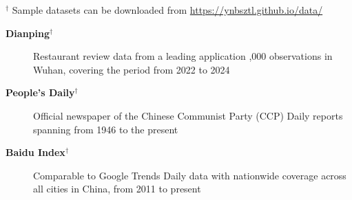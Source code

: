 
$^\dagger$ Sample datasets can be downloaded from \href{https://ynbsztl.github.io/data/}{https://ynbsztl.github.io/data/}

\begin{description}
\item[\textbf{Dianping}$^\dagger$] Restaurant review data from a leading application
,000 observations in Wuhan, covering the period from 2022 to 2024
\item[\textbf{People’s Daily}$^\dagger$] Official newspaper of the Chinese Communist Party (CCP)
\subitem Daily reports spanning from 1946 to the present
\item[\textbf{Baidu Index}$^\dagger$] Comparable to Google Trends
\subitem Daily data with nationwide coverage across all cities in China, from 2011 to present
\end{description}